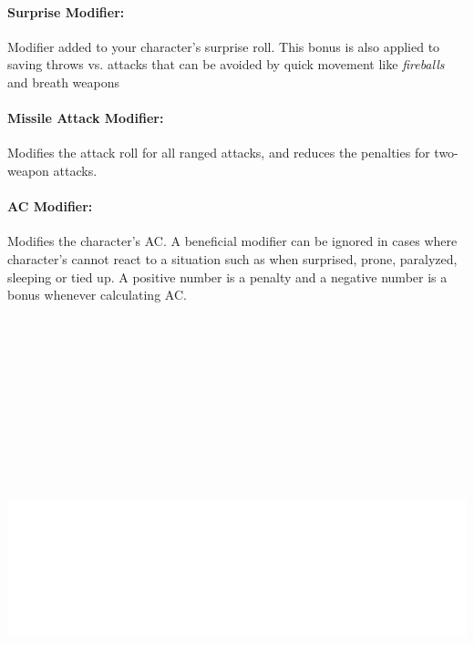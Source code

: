 \begin{multicols}{2}
\begin{minipage}{\columnwidth}
\end{minipage}

\paragraph{Surprise Modifier:}  Modifier added to your character's surprise roll.  This bonus is also applied to saving throws vs. attacks that can be avoided by quick movement like \textit{fireballs} and breath weapons

\paragraph{Missile Attack Modifier:}  Modifies the attack roll for all ranged attacks, and reduces the penalties for two-weapon attacks.

\paragraph{AC Modifier:}  Modifies the character's AC.  A beneficial modifier can be ignored in cases where character's cannot react to a situation such as when surprised, prone, paralyzed, sleeping or tied up.  A positive number is a penalty and a negative number is a bonus whenever calculating AC.

\noindent\includegraphics[width=\columnwidth, height=5.75in]{testblock.pdf}  

\end{multicols}

